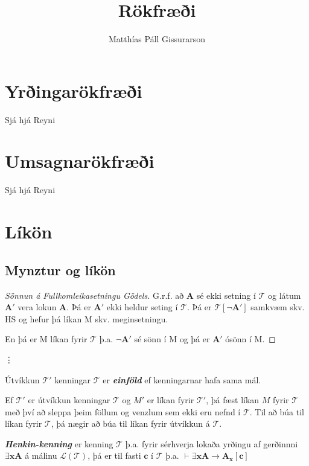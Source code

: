 \documentclass[12pt]{book}
\title{Rökfræði}
\author{Matthías Páll Gissurarson}
\newcommand{\cT}{\mathcal{T}}
\newcommand{\cL}{\mathcal{L}}
\newcommand{\emphs}[1]{\textbf{\emph{#1}}}
\begin{document}
\maketitle


\chapter{Yrðingarökfræði}

Sjá hjá Reyni
\chapter{Umsagnarökfræði}

Sjá hjá Reyni

\chapter{Líkön}

\section{Mynztur og líkön}

\begin{proof}[Sönnun á Fullkomleikasetningu Gödels]
  G.r.f. að $\mathbf{A}$ sé ekki setning í $\mathcal{T}$ og látum $\mathbf{A}'$
  vera lokun $\mathbf{A}$. Þá er $\mathbf{A}'$ ekki heldur seting í
  $\mathcal{T}$. Þá er $\mathcal{T}[\lnot \mathbf{A}']$ samkvæm skv. HS og hefur
  þá líkan M skv. meginsetningu.

  En þá er M líkan fyrir $\mathcal{T}$ þ.a. $\lnot \mathbf{A}'$ sé sönn í M
  og þá er $\mathbf{A}'$ ósönn í M.
  
\end{proof}

\vdots

\begin{skgr}[Viðbót]
 Útvíkkun $\cT'$ kenningar $\cT$ er \emphs{einföld} ef kenningarnar hafa
sama mál. 
\end{skgr}


\begin{setn}[Hjálparsetn]
 Ef $\cT'$ er útvíkkun kenningar $\cT$ og $M'$ er líkan fyrir $\cT'$,
þá fæst líkan $M$ fyrir $\cT$ með því að sleppa þeim föllum og venzlum
sem ekki eru nefnd í $\cT$. Til að búa til líkan fyrir $\cT$, þá nægir að
búa til líkan fyrir útvíkkun á $\cT$. 
\end{setn}

\begin{skgr}
  \emphs{Henkin-kenning} er kenning $\cT$ þ.a. fyrir sérhverja lokaða yrðingu af
gerðinnni \( \exists \mathbf{x}\mathbf{A}\) á málinu $\cL(\cT)$, þá
  er til fasti \(\mathbf{c}\) í $\mathcal{T}$ þ.a. $\vdash  \exists \mathbf{x}\mathbf{A} \rightarrow  \mathbf{A}_{\mathbf{x}}[\mathbf{c}]$
\end{skgr}
\end{document}
